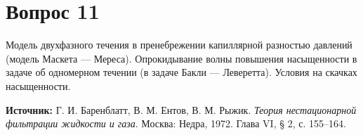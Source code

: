 \documentclass[12pt,a4paper]{article}
\begin{document}
\section*{Вопрос 11}
Модель двухфазного течения в пренебрежении капиллярной разностью давлений (модель Маскета — Мереса). Опрокидывание волны повышения насыщенности в задаче об одномерном течении (в задаче Бакли — Леверетта). Условия на скачках насыщенности.

\medskip
\noindent\textbf{Источник:} Г. И. Баренблатт, В. М. Ентов, В. М. Рыжик. \textit{Теория нестационарной фильтрации жидкости и газа}. Москва: Недра, 1972. Глава VI, § 2, с. 155--164.
\par\bigskip

\end{document}
